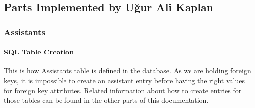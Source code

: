 \documentclass[letterpaper,10pt,english]{sphinxmanual}
\begin{document}
\begin{sphinxVerbatim}[commandchars=\\\{\}]
  
       
          
          
          \PYG{p}{[}\PYG{p}{]}
         
   
     
\end{sphinxVerbatim}


\subsection{Parts Implemented by Uğur Ali Kaplan}
\label{\detokenize{developer/kaplan:parts-implemented-by-ugur-ali-kaplan}}\label{\detokenize{developer/kaplan::doc}}

\subsubsection{Assistants}
\label{\detokenize{developer/kaplan:assistants}}

\paragraph{SQL Table Creation}
\label{\detokenize{developer/kaplan:sql-table-creation}}
This is how Assistants table is defined in the database. As we are holding foreign keys, it is impossible to
create an assistant entry before having the right values for foreign key attributes. Related information
about how to create entries for those tables can be found in the other parts of this documentation.
\end{document}
